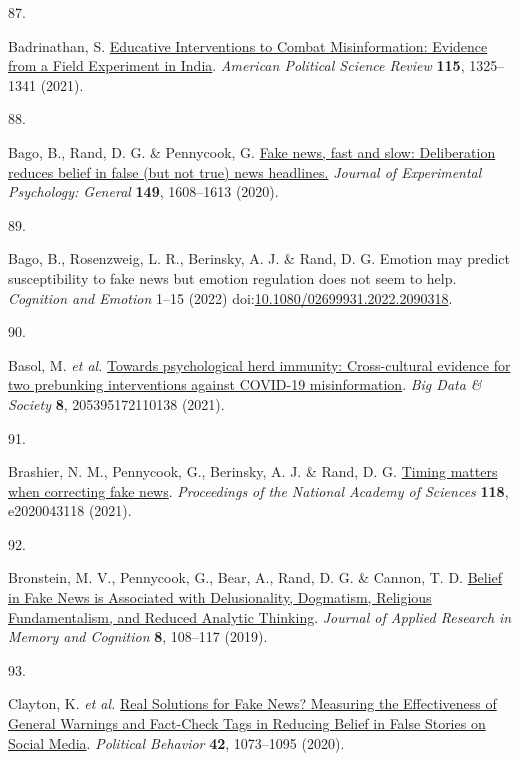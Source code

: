 \documentclass[
  man]{apa6}
\newlength{\cslhangindent}
\newlength{\csllabelwidth}
\newenvironment{CSLReferences}[2] %
 {\begin{list}{}{%
  \setlength{\itemindent}{0pt}
  \setlength{\leftmargin}{0pt}
  \setlength{\parsep}{0pt}
  \ifodd #1
   \setlength{\leftmargin}{\cslhangindent}
   \setlength{\itemindent}{-1\cslhangindent}
  \fi
  \setlength{\itemsep}{#2\baselineskip}}}
 {\end{list}}
\newcommand{\CSLLeftMargin}[1]{\parbox[t]{\csllabelwidth}{\strut#1\strut}}
\newcommand{\CSLRightInline}[1]{\parbox[t]{\linewidth - \csllabelwidth}{\strut#1\strut}}
\begin{document}
\begin{CSLReferences}{0}{0}
\CSLLeftMargin{87. }%
\CSLRightInline{*Badrinathan, S. \href{https://doi.org/10.1017/S0003055421000459}{Educative Interventions to Combat Misinformation: Evidence from a Field Experiment in India}. \emph{American Political Science Review} \textbf{115}, 1325--1341 (2021).}

\CSLLeftMargin{88. }%
\CSLRightInline{*Bago, B., Rand, D. G. \& Pennycook, G. \href{https://doi.org/10.1037/xge0000729}{Fake news, fast and slow: Deliberation reduces belief in false (but not true) news headlines.} \emph{Journal of Experimental Psychology: General} \textbf{149}, 1608--1613 (2020).}

\CSLLeftMargin{89. }%
\CSLRightInline{*Bago, B., Rosenzweig, L. R., Berinsky, A. J. \& Rand, D. G. Emotion may predict susceptibility to fake news but emotion regulation does not seem to help. \emph{Cognition and Emotion} 1--15 (2022) doi:\href{https://doi.org/10.1080/02699931.2022.2090318}{10.1080/02699931.2022.2090318}.}

\CSLLeftMargin{90. }%
\CSLRightInline{*Basol, M. \emph{et al.} \href{https://doi.org/10.1177/20539517211013868}{Towards psychological herd immunity: Cross-cultural evidence for two prebunking interventions against COVID-19 misinformation}. \emph{Big Data \& Society} \textbf{8}, 205395172110138 (2021).}

\CSLLeftMargin{91. }%
\CSLRightInline{*Brashier, N. M., Pennycook, G., Berinsky, A. J. \& Rand, D. G. \href{https://doi.org/10.1073/pnas.2020043118}{Timing matters when correcting fake news}. \emph{Proceedings of the National Academy of Sciences} \textbf{118}, e2020043118 (2021).}

\CSLLeftMargin{92. }%
\CSLRightInline{*Bronstein, M. V., Pennycook, G., Bear, A., Rand, D. G. \& Cannon, T. D. \href{https://doi.org/10.1016/j.jarmac.2018.09.005}{Belief in Fake News is Associated with Delusionality, Dogmatism, Religious Fundamentalism, and Reduced Analytic Thinking}. \emph{Journal of Applied Research in Memory and Cognition} \textbf{8}, 108--117 (2019).}

\CSLLeftMargin{93. }%
\CSLRightInline{*Clayton, K. \emph{et al.} \href{https://doi.org/10.1007/s11109-019-09533-0}{Real Solutions for Fake News? Measuring the Effectiveness of General Warnings and Fact-Check Tags in Reducing Belief in False Stories on Social Media}. \emph{Political Behavior} \textbf{42}, 1073--1095 (2020).}


\end{CSLReferences}
\end{document}
